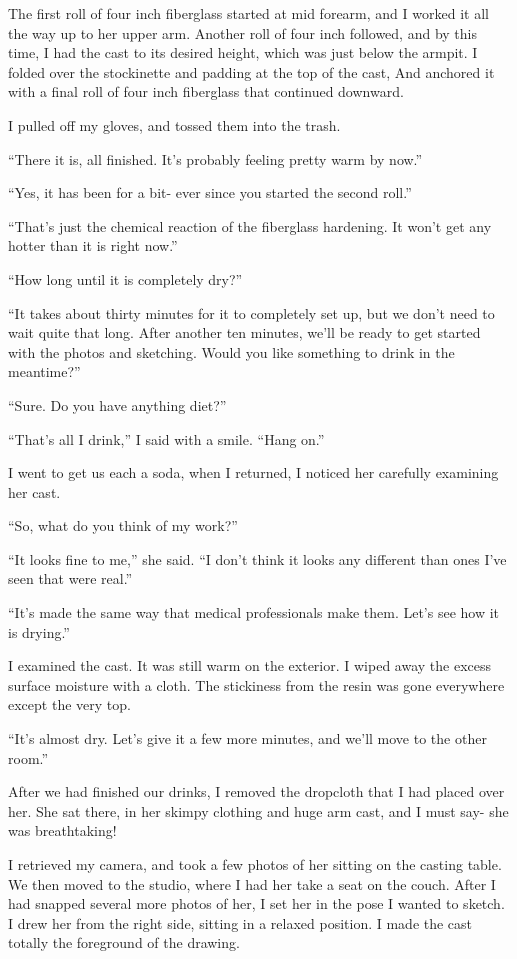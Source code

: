 The first roll of four inch fiberglass started at mid forearm, and I worked it all the way up to
her upper arm. Another roll of four inch followed, and by this time, I had the cast to its
desired height, which was just below the armpit. I folded over the stockinette and padding at
the top of the cast, And anchored it with a final roll of four inch fiberglass that continued
downward.

I pulled off my gloves, and tossed them into the trash.

``There it is, all finished. It's probably feeling pretty warm by now.''

``Yes, it has been for a bit- ever since you started the second roll.''

``That's just the chemical reaction of the fiberglass hardening. It won't get any hotter than it
is right now.''

``How long until it is completely dry?''

``It takes about thirty minutes for it to completely set up, but we don't need to wait quite
that long. After another ten minutes, we'll be ready to get started with the photos and
sketching. Would you like something to drink in the meantime?''

``Sure. Do you have anything diet?''

``That's all I drink,'' I said with a smile. ``Hang on.''

I went to get us each a soda, when I returned, I noticed her carefully examining her cast.

``So, what do you think of my work?''

``It looks fine to me,'' she said. ``I don't think it looks any different than ones I've seen
that were real.''

``It's made the same way that medical professionals make them. Let's see how it is drying.''

I examined the cast. It was still warm on the exterior. I wiped away the excess surface moisture
with a cloth. The stickiness from the resin was gone everywhere except the very top.

``It's almost dry. Let's give it a few more minutes, and we'll move to the other room.''

After we had finished our drinks, I removed the dropcloth that I had placed over her. She sat
there, in her skimpy clothing and huge arm cast, and I must say- she was breathtaking!

I retrieved my camera, and took a few photos of her sitting on the casting table. We then moved
to the studio, where I had her take a seat on the couch. After I had snapped several more photos
of her, I set her in the pose I wanted to sketch. I drew her from the right side, sitting in a
relaxed position. I made the cast totally the foreground of the drawing.

